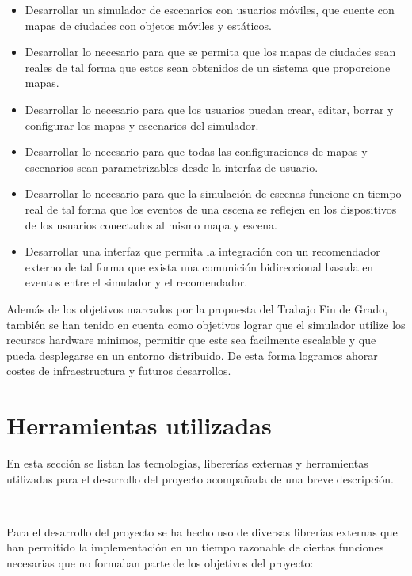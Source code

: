 \begin{itemize}
	\item Desarrollar un simulador de escenarios con usuarios móviles, que cuente con mapas de ciudades con objetos móviles y estáticos.
	\item Desarrollar lo necesario para que se permita que los mapas de ciudades sean reales de tal forma que estos sean obtenidos de un sistema que proporcione mapas.
       \item Desarrollar lo necesario para que los usuarios puedan crear, editar, borrar y configurar los mapas y escenarios del simulador.
       \item Desarrollar lo necesario para que todas las configuraciones de mapas y escenarios sean parametrizables desde la interfaz de usuario.
       \item Desarrollar lo necesario para que la simulación de escenas funcione en tiempo real de tal forma que los eventos de una escena se reflejen en los dispositivos de los usuarios conectados al mismo mapa y escena.
       \item Desarrollar una interfaz que permita la integración con un recomendador externo de tal forma que exista una comunición bidireccional basada en eventos entre el simulador y el recomendador.
\end{itemize}

Además de los objetivos marcados por la propuesta del Trabajo Fin de Grado, también se han tenido en cuenta como objetivos lograr que el simulador utilize los recursos hardware minimos, permitir que este sea facilmente escalable y que pueda desplegarse en un entorno distribuido. De esta forma logramos ahorar costes de infraestructura y futuros desarrollos.

\section{Herramientas utilizadas}
\thispagestyle{empty}


En esta sección se listan las tecnologias, libererías externas y herramientas utilizadas para el desarrollo del proyecto acompañada de una breve descripción.

       \vspace{0.7cm}
\\
\thispagestyle{empty}

Para el desarrollo del proyecto se ha hecho uso de diversas librerías externas que han permitido la implementación en un tiempo razonable de ciertas funciones necesarias que no formaban parte de los objetivos del proyecto:

